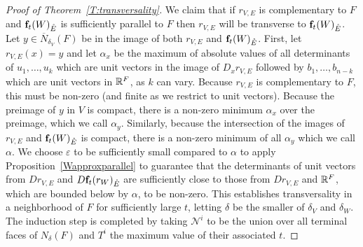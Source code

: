 \begin{proof}[Proof of Theorem~\ref{T:transversality}]
We claim that if $r_{V,E}$ is complementary to $F$ and $\mathbf{f}_t(W)_{\mathring{E}}$ is sufficiently parallel to $F$ then $r_{V,E}$
will be transverse to $\mathbf{f}_t(W)_{\mathring{E}}$.  Let $y \in \overline N_{\delta_V}(F)$ be in the image of both
$r_{V,E}$ and $\mathbf{f}_t(W)_{\mathring{E}}$. First, let $r_{V,E} (x) = y$ and let $\alpha_x$ be the maximum of absolute values of
all determinants of  $u_1, \ldots, u_k$ which are unit vectors in the image of $D_x r_{V,E}$ followed by $b_1, \ldots, b_{n-k}$
which are unit vectors in $\mathbb{R}^F$, as $k$ can vary.  Because
$r_{V,E}$ is complementary to $F$, this must be non-zero (and finite as we restrict to unit vectors).
 Because the preimage of $y$ in $V$ is compact,
there is a non-zero minimum $\alpha_x$ over the preimage, which we call $\alpha_y$.  Similarly, because the intersection
of the images of $r_{V,E}$ and $\mathbf{f}_t(W)_{\mathring{E}}$ is compact, there is a non-zero minimum of all $\alpha_y$ which we call $\alpha$.
We choose $\varepsilon$ to be sufficiently small compared to $\alpha$ to apply  Proposition~\ref{Wapproxparallel}  to
guarantee that the determinants
of unit vectors from $D r_{V,E}$ and $D \mathbf{f}_t (r_W)_{\mathring{E}}$ are sufficiently close to those from  $D r_{V,E}$ and $\mathbb{R}^F$,
which are bounded below by $\alpha$, to be non-zero.  This establishes transversality in a neighborhood of $F$ for sufficiently large $t$,
letting $\delta$ be the smaller of $\delta_V$ and $\delta_W$.  	The induction step is completed by taking $\mathcal N^i$ to be the union over all terminal faces of $N_\delta(F)$ and $T^i$ the maximum value of their associated $t$.

\begin{comment}

	AROUND HERE IS WHERE THINGS STILL NEED TO BE FIXED UP.

	Similarly, consider a $\zeta > 0$ small enough so that the closed $L^\infty$ neighborhood $\overline N_\zeta(F^-)$ of $F^-$ is such that either $W_E \cap \overline N_\zeta(F^-) = \emptyset$ or for any $x \in W_E \cap \overline N_\zeta(F^-)$ the affine space $T_xW_E$ is transverse to the span of $\beta_{F^-} = \{\e_i\ |\ i \in F^-_{01}\}$ at $x$.
	In the latter case, for every such $x$, the transversality implies that $T_xW_E$ projects surjectively onto $F$; in other words, the projection of $W_E \cap \overline N_\zeta(F^-)$ to $F$ is a submersion onto its image.
	Therefore, we may choose continuously with $x$ a subset of $T_xW_E$ of the form $\beta_x = \{\e_j + v_j\ |\ j \in F_{01}\}$ such that $v_j$ is in the span of $\beta_{F^-}$.
	As $W_E \cap \overline N_\zeta(F^-)$ is compact, the $v_j$ have bounded norm.


\end{comment}
\end{proof}
